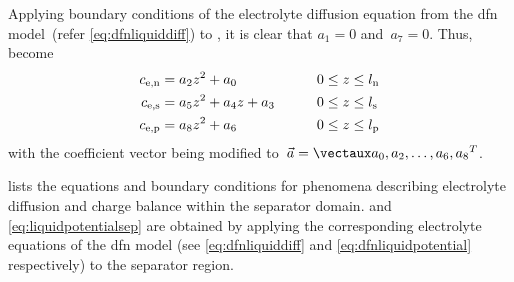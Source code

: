 Applying     boundary     conditions     of    the     electrolyte     diffusion
equation   from   the   \gls{dfn}   model~(refer   \cref{eq:dfnliquiddiff})   to
,  it is  clear that  ${a_1 =  0}$
and~${a_7 = 0}$. Thus,  become
\begin{alignat}{2}
    c_{\text{e,n}}      & = a_2 z^2 + a_0         \qquad          &  & 0 \le z \le l_\text{n}\label{eq:cenquadreduced} \\
    c_{\text{e,s}}      & = a_5 z^2 + a_4 z + a_3 \qquad          &  & 0 \le z \le l_\text{s}\label{eq:cesquadreduced} \\
    c_{\text{e,p}}      & = a_8 z^2 + a_6         \qquad          &  & 0 \le z \le l_\text{p}\label{eq:cepquadreduced}
\end{alignat}
with  the  coefficient  vector being  modified  to~${\vec{a} = \vect{a_0,a_2, \dots ,a_6, a_8}}$.


 lists  the equations and  boundary conditions
for  phenomena  describing  electrolyte  diffusion  and  charge  balance  within
the separator  domain.  and \cref{eq:liquidpotentialsep}
are  obtained  by  applying  the  corresponding  electrolyte  equations  of  the
\gls{dfn}  model  (see \cref{eq:dfnliquiddiff}  and \cref{eq:dfnliquidpotential}
respectively) to the separator region.



